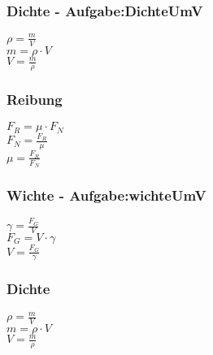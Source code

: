 \subsubsection{Dichte - Aufgabe:DichteUmV} 
\begin{minipage}{0.45\textwidth} 
$ \rho  = \frac{m}{V} $\\ 
$ m = \rho \cdot V $\\ 
$ V = \frac{m}{\rho } $\\ 
\end{minipage} 
\begin{minipage}{0.45\textwidth} 
 
\end{minipage} 
\subsubsection{Reibung} 
\begin{minipage}{0.45\textwidth} 
$ F_{R}  = \mu \cdot F_{N} $\\ 
$ F_{N}  = \frac{F_{R} }{\mu } $\\ 
$ \mu  = \frac{F_{R} }{F_{N} } $\\ 
\end{minipage} 
\begin{minipage}{0.45\textwidth} 
 
\end{minipage} 
\subsubsection{Wichte - Aufgabe:wichteUmV} 
\begin{minipage}{0.45\textwidth} 
$ \gamma  = \frac{F_{G} }{V} $\\ 
$ F_{G}  = V\cdot \gamma $\\ 
$ V = \frac{F_{G} }{\gamma } $\\ 
\end{minipage} 
\begin{minipage}{0.45\textwidth} 
 
\end{minipage} 
\subsubsection{Dichte} 
\begin{minipage}{0.45\textwidth} 
$ \rho  = \frac{m}{V} $\\ 
$ m = \rho \cdot V $\\ 
$ V = \frac{m}{\rho } $\\ 
\end{minipage} 
\begin{minipage}{0.45\textwidth} 
 
\end{minipage} 
